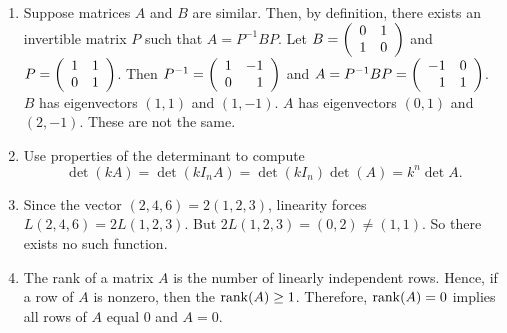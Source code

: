 \documentclass{ximera}
\begin{document}
\begin{exercise}
\begin{solution}
\begin{enumerate}
\item Suppose matrices $A$ and $B$ are similar. Then, by definition, there exists an invertible matrix $P$ such that $A=P^{-1}BP$. Let $B=\left(\begin{array}{rrrrrrrrrrrrrrrrrr}  0 & 1 \\ 1 & 0 \end{array}\right)$ and $P=\left(\begin{array}{rrrrrrrrrrrrrrrrrr}  1 & 1 \\ 0 & 1 \end{array}\right)$. Then $P^{-1}=\left(\begin{array}{rrrrrrrrrrrrrrrrrr}  1 & -1 \\ 0 & 1 \end{array}\right)$ and $A=P^{-1}BP=\left(\begin{array}{rrrrrrrrrrrrrrrrrr}  -1 & 0 \\ 1 & 1 \end{array}\right)$. $B$ has eigenvectors $(1,1)$ and $(1,-1)$. $A$ has eigenvectors $(0,1)$ and $(2,-1)$. These are not the same. 

\item Use properties of the determinant to compute
\[
\det(kA) = \det (kI_n A) = \det (kI_n)\det (A)=k^n \det A.
\]

\item Since the vector $(2,4,6)=2(1,2,3)$, linearity forces $L(2,4,6)=2L(1,2,3)$. But $2L(1,2,3)=(0,2)\ne (1,1)$. So there exists no such function.

\item The rank of a matrix $A$ is the number of linearly independent rows. Hence, if a row of $A$ is nonzero, then the ${\rm rank}(A)\geq 1$.  Therefore, ${\rm rank}(A) = 0$ implies all rows of $A$ equal $0$ and $A=0$.
\end{enumerate}



  
\end{solution}
\end{exercise}
\end{document}
